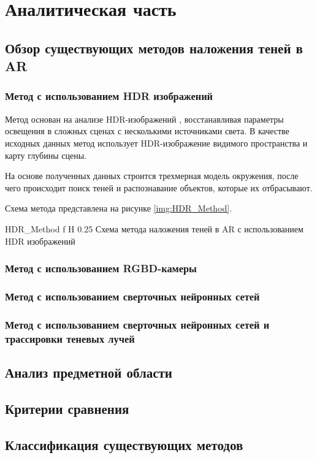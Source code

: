 \chapter{Аналитическая часть}


\section{Обзор существующих методов наложения теней в AR}

\subsection{Метод с использованием HDR изображений}

Метод основан на анализе HDR-изображений \cite{hdri}, восстанавливая параметры освещения в сложных сценах с несколькими источниками света. В качестве исходных данных метод использует HDR-изображение видимого пространства и карту глубины сцены.

На основе полученных данных строится трехмерная модель окружения, после чего происходит поиск теней и распознавание объектов, которые их отбрасывают. 

Схема метода представлена на рисунке \ref{img:HDR_Method}.

	{HDR_Method}
	{f}
	{H}
	{0.25\textwidth}
	{Схема метода наложения теней в AR с использованием HDR изображений}

\subsection{Метод с использованием RGBD-камеры}

\subsection{Метод с использованием сверточных нейронных сетей}

\subsection{Метод с использованием сверточных нейронных сетей и трассировки теневых лучей}

\section{Анализ предметной области}



\section{Критерии сравнения}



\section{Классификация существующих методов}